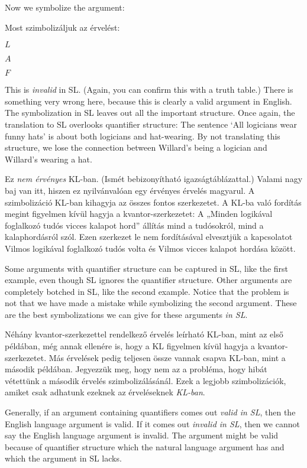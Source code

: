 Now we symbolize the argument:

Most szimbolizáljuk az érvelést:
\begin{earg}
\item[]$L$
\item[]$A$
\item[\therefore] $F$
\end{earg}

This is \emph{invalid} in SL. (Again, you can confirm this with a truth table.) There is something very wrong here, because this is clearly a valid argument in English. The symbolization in SL leaves out all the important structure. Once again, the translation to SL overlooks quantifier structure: The sentence `All logicians wear funny hats' is about both logicians and hat-wearing. By not translating this structure, we lose the connection between Willard's being a logician and Willard's wearing a hat.

Ez \emph{nem érvényes} KL-ban. (Ismét bebizonyítható igazságtáblázattal.) Valami nagy baj van itt, hiszen ez nyilvánvalóan egy érvényes érvelés magyarul. A szimbolizáció KL-ban kihagyja az összes fontos szerkezetet. A KL-ba való fordítás megint figyelmen kívül hagyja a kvantor-szerkezetet: A „Minden logikával foglalkozó tudós vicces kalapot hord” állítás mind a tudósokról, mind a kalaphordásról szól. Ezen szerkezet le nem fordításával elvesztjük a kapcsolatot Vilmos logikával foglalkozó tudós volta és Vilmos vicces kalapot hordása között.

Some arguments with quantifier structure can be captured in SL, like the first example, even though SL ignores the quantifier structure. Other arguments are completely botched in SL, like the second example. Notice that the problem is not that we have made a mistake while symbolizing the second argument. These are the best symbolizations we can give for these arguments \emph{in SL}.

Néhány kvantor-szerkezettel rendelkező érvelés leírható KL-ban, mint az első példában, még annak ellenére is, hogy a KL figyelmen kívül hagyja a kvantor-szerkezetet. Más érvelések pedig teljesen össze vannak csapva KL-ban, mint a második példában. Jegyezzük meg, hogy nem az a probléma, hogy hibát vétettünk a második érvelés szimbolizálásánál. Ezek a legjobb szimbolizációk, amiket csak adhatunk ezeknek az érveléseknek \emph{KL-ban}.



Generally, if an argument containing quantifiers comes out \emph{valid in SL}, then the English language argument is valid. If it comes out \emph{invalid in SL}, then we cannot say the English language argument is invalid. The argument might be valid because of quantifier structure which the natural language argument has and which the argument in SL lacks.


